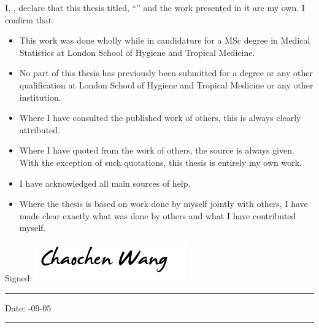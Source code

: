 \documentclass[
12pt, %
english, %
singlespacing, %
headsepline, %
table]{MastersDoctoralThesis} %
\begin{document}
\onehalfspacing

\begin{declaration}
\addchaptertocentry{\authorshipname} %
\noindent I, \authorname, declare that this thesis titled, \enquote{\ttitle} and the work presented in it are my own. I confirm that:

\begin{itemize}
\item This work was done wholly while in candidature for a MSc degree in Medical Statistics at London School of Hygiene and Tropical Medicine.
\item No part of this thesis has previously been submitted for a degree or any other qualification at London School of Hygiene and Tropical Medicine or any other institution.
\item Where I have consulted the published work of others, this is always clearly attributed.
\item Where I have quoted from the work of others, the source is always given. With the exception of such quotations, this thesis is entirely my own work.
\item I have acknowledged all main sources of help.
\item Where the thesis is based on work done by myself jointly with others, I have made clear exactly what was done by others and what I have contributed myself.\\
\end{itemize}

\noindent Signed: \;\;\;\;\;\;\includegraphics[height=2.5\baselineskip]{Figures/signature.png}\\
\rule[0.5em]{25em}{0.5pt} %

\noindent Date: \;\;\;\;\;\;\;\;\;\;\;\;\;\;\;-09-05\\
\rule[0.5em]{25em}{0.5pt} %
\end{declaration}

\end{document}

